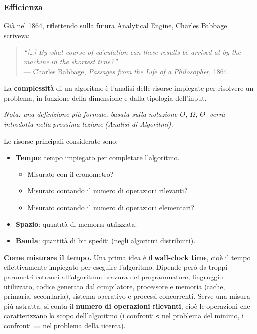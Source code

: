 \documentclass[12pt, a4paper]{article}
\begin{document}
\subsubsection{Efficienza}

Già nel 1864, riflettendo sulla futura Analytical Engine, Charles Babbage scriveva:
\begin{quote}
\textit{``[\dots] By what course of calculation can these results be arrived at by the machine in the shortest time?''} \\
--- Charles Babbage, \textit{Passages from the Life of a Philosopher}, 1864.
\end{quote}

\begin{tcolorbox}[colback=lightergray!10, colframe=tocsec, title=\textbf{Definizione: Complessità di un Algoritmo}]
\label{def:complessita-intro}
La \textbf{complessità} di un algoritmo è l'analisi delle risorse impiegate per risolvere un problema, in funzione della dimensione e dalla tipologia dell'input.
\end{tcolorbox}
\textit{Nota: una definizione più formale, basata sulla notazione $O$, $\Omega$, $\Theta$, verrà introdotta nella prossima lezione (Analisi di Algoritmi).}

Le risorse principali considerate sono:
\begin{itemize}
    \item \textbf{Tempo}: tempo impiegato per completare l'algoritmo.
    \begin{itemize}
        \item Misurato con il cronometro?
        \item Misurato contando il numero di operazioni rilevanti?
        \item Misurato contando il numero di operazioni elementari?
    \end{itemize}
    \item \textbf{Spazio}: quantità di memoria utilizzata.
    \item \textbf{Banda}: quantità di bit spediti (negli algoritmi distribuiti).
\end{itemize}

\textbf{Come misurare il tempo.} Una prima idea è il \textbf{wall-clock time}, cioè il tempo effettivamente impiegato per eseguire l'algoritmo. Dipende però da troppi parametri estranei all'algoritmo: bravura del programmatore, linguaggio utilizzato, codice generato dal compilatore, processore e memoria (cache, primaria, secondaria), sistema operativo e processi concorrenti. Serve una misura più astratta: si conta il \textbf{numero di operazioni rilevanti}, cioè le operazioni che caratterizzano lo scopo dell'algoritmo (i confronti \texttt{<} nel problema del minimo, i confronti \texttt{==} nel problema della ricerca).
\end{document}
